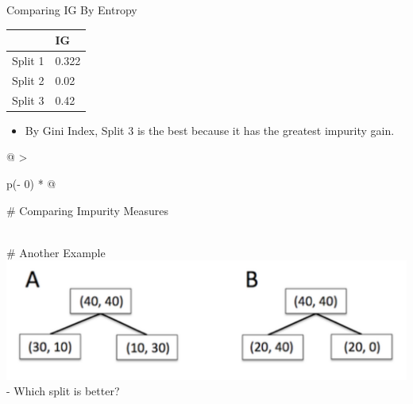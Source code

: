 \documentclass[
  ignorenonframetext,
]{beamer}
\providecommand{\tightlist}{%
  \setlength{\itemsep}{0pt}\setlength{\parskip}{0pt}}
\begin{document}
\begin{frame}{Comparing IG By Entropy}
\protect\hypertarget{comparing-ig-by-entropy}{}
\begin{longtable}[]{@{}ll@{}}
\toprule
& IG \\
\midrule
\endhead
Split 1 & 0.322 \\
Split 2 & 0.02 \\
Split 3 & 0.42 \\
\bottomrule
\end{longtable}

\begin{itemize}
\tightlist
\item
  By Gini Index, Split 3 is the best because it has the greatest
  impurity gain.
\end{itemize}

\begin{longtable}[]{@{}
  >{\raggedright\arraybackslash}p{(\columnwidth - 0\tabcolsep) * }@{}}
\toprule
\begin{minipage}[b]{\linewidth}\raggedright
\# Comparing Impurity Measures
\end{minipage} \\
\midrule
\endhead
\# Another Example \\
\includegraphics{images/i1.png} - Which split is better? \\
 \\
 \\
 \\
 \\
 \\
 \\
 \\
 \\
 \\
\bottomrule
\end{longtable}
\end{frame}
\end{document}
